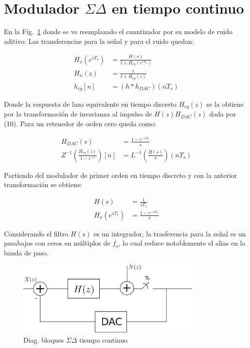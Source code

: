 \documentclass[a4paper,conference]{IEEEtran}
\begin{document}
\section{Modulador $\Sigma\Delta$ en tiempo continuo}

En la Fig.~\ref{fig:SDTC} donde se ve reemplazado el cuantizador por su modelo de ruido aditivo:
Las transferencias para la se\~nal y para el ruido quedan:

\begin{align}
H_x(e^{sT_s}) &= \frac{H(s)}{1+H_{eq}(e^{sT_s})} \\
H_n(z) &= \frac{1}{1+H_{eq}(z)} \\
h_{eq}[n] &= (h\ast h_{DAC})(nT_s)
\end{align}

Donde la respuesta de lazo equivalente en tiempo discreto $H_{eq}(z)$ se la obtiene por la transformaci\'on de invarianza al impulso\cite{DSP:Pro-Man} de $H(z)H_{DAC}(z)$ dada por (10). Para un retenedor de orden cero queda como:

\begin{align}
 H_{DAC}(s)&=\frac{1-e^{-sT_s}}{s}\\
 Z^{-1}(\frac{H_{eq}(z)}{1-z^{-1}})[n]&=L^{-1}(\frac{H(s)}{s})(nT_s)
\end{align}

Partiendo del modulador de primer orden en tiempo discreto y con la anterior transformaci\'on se obtiene:

\begin{align}
 H(s)&=\frac{1}{sT_s}\\
 H_x(e^{sT_s})&= \frac{1-e^{-sT_s}}{s}
\end{align}

Considerando el filtro $H(s)$ es un integrador, la trasferencia para la se\~nal es un pasabajos con ceros en múltiplos de $f_s$, lo cual reduce notablemente el alias en la banda de paso.

\begin{figure}[!t]
\centering
\includegraphics[width=3.6in]{Sigma-Delta_Tiempo_Continuo}
\caption{Diag. bloques $\Sigma\Delta$ tiempo continuo}
\label{fig:SDTC}
\end{figure}
\end{document}
